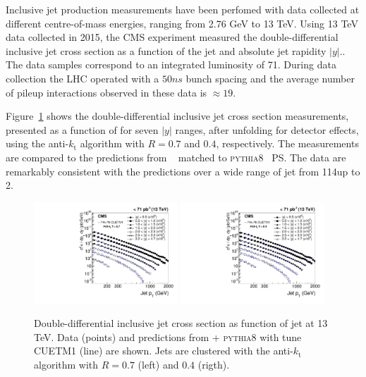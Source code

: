 \documentclass{PoS}
\providecommand{\kts}{\ensuremath{k_{\mathrm{t}}}\xspace}
\providecommand{\PYTHIAE} {{\textsc{pythia8}}\xspace}
\begin{document}
Inclusive jet production measurements have been perfomed with data collected at different centre-of-mass energies, ranging from 2.76 GeV to 13 TeV. 
Using 13 TeV data collected in 2015, the CMS experiment measured the double-differential inclusive jet
cross section as a function of the jet \pt and absolute jet rapidity $|y|$.\cite{Khachatryan:2016wdh}. The data samples correspond to
an integrated luminosity of 71\pbinv. During data collection the LHC operated with a $50\unit{ns}$ bunch spacing and the
average number of pileup interactions observed in these data is ${\approx}19$.   

Figure~\ref{fig:crossSection} shows the double-differential inclusive jet cross section measurements,
presented as a function of \pt for seven $|y|$ ranges, after
unfolding for detector effects, using the anti-\kts algorithm with $R =
0.7$ and $0.4$, respectively. The measurements are compared to the predictions from \POWHEG~\cite{Alioli:2010xa}
matched to \PYTHIAE~\cite{Sjostrand:2007gs} PS. The data are remarkably consistent with the predictions over a wide range of jet \pt from 114\GeV up to
2\TeV.

\begin{figure}[htbp] \centering
  \includegraphics[width=0.48\textwidth]{Figure1-a.pdf}
  \includegraphics[width=0.48\textwidth]{Figure1-b.pdf}
  \caption{Double-differential inclusive jet cross section as function of jet \pt at 13 TeV. Data (points) and
predictions from \POWHEG + \PYTHIAE with tune CUETM1 (line) are shown. Jets are clustered with the anti-\kts
algorithm with $R = 0.7$ (left) and $0.4$ (rigth).}
  \label{fig:crossSection}
\end{figure}
\end{document}
